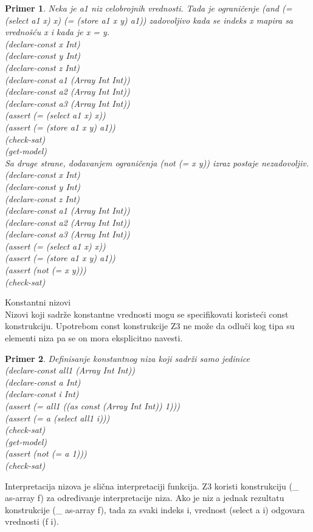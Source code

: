 \documentclass[12pt,oneside]{memoir}
\newtheorem{primer}{Primer}
\begin{document}
\begin{primer}
Neka je a1 niz celobrojnih vrednosti. Tada je ograničenje 
(and (= (select a1 x) x) (= (store a1 x y) a1)) zadovoljivo kada se indeks x mapira sa vrednošću x i kada je x = y.
\\(declare-const x Int)
\\(declare-const y Int)
\\(declare-const z Int)
\\(declare-const a1 (Array Int Int))
\\(declare-const a2 (Array Int Int))
\\(declare-const a3 (Array Int Int))
\\(assert (= (select a1 x) x))
\\(assert (= (store a1 x y) a1))
\\(check-sat)
\\(get-model)
\\
Sa druge strane, dodavanjem ograničenja (not (= x y)) izraz postaje nezadovoljiv.
\\(declare-const x Int)
\\(declare-const y Int)
\\(declare-const z Int)
\\(declare-const a1 (Array Int Int))
\\(declare-const a2 (Array Int Int))
\\(declare-const a3 (Array Int Int))
\\(assert (= (select a1 x) x))
\\(assert (= (store a1 x y) a1))
\\(assert (not (= x y)))
\\(check-sat)
\end{primer}

Konstantni nizovi
\\

Nizovi koji sadrže konstantne vrednosti mogu se specifikovati koristeći const konstrukciju. Upotrebom const konstrukcije Z3 ne može da odluči kog tipa su elementi niza pa se on mora eksplicitno navesti. 
\\
\begin{primer} Definisanje konstantnog niza koji sadrži samo jedinice
\\(declare-const all1 (Array Int Int))
\\(declare-const a Int)
\\(declare-const i Int)
\\(assert (= all1 ((as const (Array Int Int)) 1)))
\\(assert (= a (select all1 i)))
\\(check-sat)
\\(get-model)
\\(assert (not (= a 1)))
\\(check-sat)
\end{primer}
Interpretacija nizova je slična interpretaciji funkcija. Z3 koristi konstrukciju (\_ as-array f) za određivanje interpretacije niza. Ako je niz a jednak rezultatu konstrukcije (\_ as-array f), tada za svaki indeks i, vrednost (select a i) odgovara vrednosti (f i). 
\end{document}
